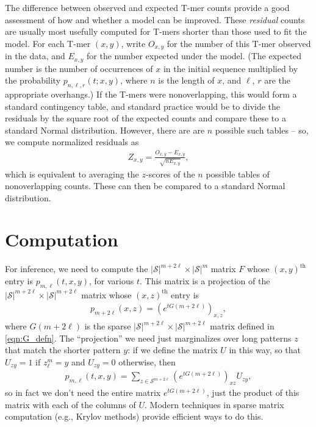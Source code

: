 \documentclass{article}
\newcommand{\calS}{\mathcal{S}}  %
\theoremstyle{plain}
\theoremstyle{definition}
\begin{document}
The difference between observed and expected T-mer counts provide a good assessment of how and whether a model can be improved.
These \emph{residual} counts are usually most usefully computed for T-mers shorter than those used to fit the model.
For each T-mer $(x,y)$, write $O_{x,y}$ for the number of this T-mer observed in the data,
and $E_{x,y}$ for the number expected under the model.
(The expected number is the number of occurrences of $x$ in the initial sequence
multiplied by the probability $p_{n,\ell,r}(t;x,y)$, where $n$ is the length of $x$,
and $\ell$, $r$ are the appropriate overhangs.)
If the T-mers were nonoverlapping, this would form a standard contingency table,
and standard practice would be to divide the residuals by the square root of the expected counts
and compare these to a standard Normal distribution.
However, there are are $n$ possible such tables --
so, we compute normalized residuals as
\begin{align}
    Z_{x,y} = \frac{ O_{x,y} - E_{x,y} }{ \sqrt{n E_{x,y}} },
\end{align}
which is equivalent to averaging the $z$-scores of the $n$ possible tables of nonoverlapping counts.
These can then be compared to a standard Normal distribution.

\section{Computation}

For inference, we need to compute the $|\calS|^{m+2\ell} \times |\calS|^m$ matrix $F$ whose $(x,y)^\text{th}$ entry is $p_{m,\ell}(t,x,y)$,
for various $t$.
This matrix is a projection of the $|\calS|^{m+2\ell} \times |\calS|^{m+2\ell}$ matrix whose $(x,z)^\text{th}$ entry is
\begin{align}
    p_{m+2\ell}(x,z) = \left( e^{t G(m+2\ell)} \right)_{x,z} ,
\end{align}
where $G(m+2\ell)$ is the sparse $|\calS|^{m+2\ell} \times |\calS|^{m+2\ell}$ matrix defined in \eqref{eqn:G_defn}.
The ``projection'' we need just marginalizes over long patterns $z$ that match the shorter pattern $y$:
if we define the matrix $U$ in this way, so that $U_{zy}=1$ if $z_\ell^m=y$ and $U_{zy}=0$ otherwise,
then
\begin{align} \label{eqn:Tmer_trans}
    p_{m,\ell}(t,x,y) = \sum_{z \in \calS^{m+2\ell}} \left( e^{t G(m+2\ell)} \right)_{xz} U_{zy} ,
\end{align}
so in fact we don't need the entire matrix $e^{t G(m+2\ell)}$,
just the product of this matrix with each of the columns of $U$.
Modern techniques in sparse matrix computation (e.g., Krylov methods) provide efficient ways to do this.
\end{document}
